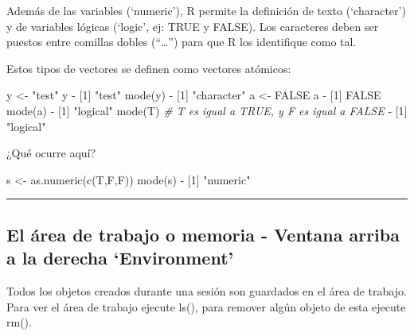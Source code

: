 \documentclass[
]{book}
\newenvironment{Shaded}{\begin{snugshade}}{\end{snugshade}}
\newcommand{\CommentTok}[1]{\textcolor[rgb]{0.56,0.35,0.01}{\textit{#1}}}
\newcommand{\ConstantTok}[1]{\textcolor[rgb]{0.00,0.00,0.00}{#1}}
\newcommand{\DecValTok}[1]{\textcolor[rgb]{0.00,0.00,0.81}{#1}}
\newcommand{\FunctionTok}[1]{\textcolor[rgb]{0.00,0.00,0.00}{#1}}
\newcommand{\NormalTok}[1]{#1}
\newcommand{\OtherTok}[1]{\textcolor[rgb]{0.56,0.35,0.01}{#1}}
\newcommand{\SpecialCharTok}[1]{\textcolor[rgb]{0.00,0.00,0.00}{#1}}
\newcommand{\StringTok}[1]{\textcolor[rgb]{0.31,0.60,0.02}{#1}}
\begin{document}
Además de las variables (`numeric'), R permite la definición de texto (`character') y de variables lógicas (`logic', ej: TRUE y FALSE). Los caracteres deben ser puestos entre comillas dobles (``\ldots{}'') para que R los identifique como tal.

Estos tipos de vectores se definen como vectores atómicos:

\begin{Shaded}
\begin{Highlighting}[]
\NormalTok{y }\OtherTok{\textless{}{-}} \StringTok{"test"}
\NormalTok{y}
\SpecialCharTok{{-}}\NormalTok{ [}\DecValTok{1}\NormalTok{] }\StringTok{"test"}
\FunctionTok{mode}\NormalTok{(y)}
\SpecialCharTok{{-}}\NormalTok{ [}\DecValTok{1}\NormalTok{] }\StringTok{"character"}
\NormalTok{a }\OtherTok{\textless{}{-}} \ConstantTok{FALSE}
\NormalTok{a}
\SpecialCharTok{{-}}\NormalTok{ [}\DecValTok{1}\NormalTok{] }\ConstantTok{FALSE}
\FunctionTok{mode}\NormalTok{(a)}
\SpecialCharTok{{-}}\NormalTok{ [}\DecValTok{1}\NormalTok{] }\StringTok{"logical"}
\FunctionTok{mode}\NormalTok{(T) }\CommentTok{\# T es igual a TRUE, y F es igual a FALSE}
\SpecialCharTok{{-}}\NormalTok{ [}\DecValTok{1}\NormalTok{] }\StringTok{"logical"}
\end{Highlighting}
\end{Shaded}

¿Qué ocurre aquí?

\begin{Shaded}
\begin{Highlighting}[]
\NormalTok{s }\OtherTok{\textless{}{-}} \FunctionTok{as.numeric}\NormalTok{(}\FunctionTok{c}\NormalTok{(T,F,F)) }
\FunctionTok{mode}\NormalTok{(s)}
\SpecialCharTok{{-}}\NormalTok{ [}\DecValTok{1}\NormalTok{] }\StringTok{"numeric"}
\end{Highlighting}
\end{Shaded}

\begin{center}\rule{0.5\linewidth}{0.5pt}\end{center}

\hypertarget{el-uxe1rea-de-trabajo-o-memoria---ventana-arriba-a-la-derecha-environment}{%
\subsection{El área de trabajo o memoria - Ventana arriba a la derecha `Environment'}\label{el-uxe1rea-de-trabajo-o-memoria---ventana-arriba-a-la-derecha-environment}}

Todos los objetos creados durante una sesión son guardados en el área de trabajo. Para ver el área de trabajo ejecute ls(), para remover algún objeto de esta ejecute rm().
\end{document}
